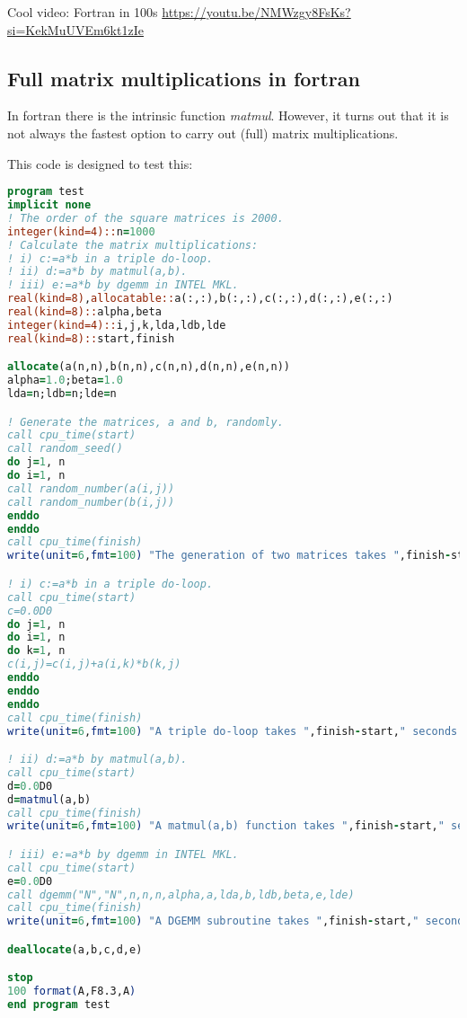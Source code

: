 
Cool video: Fortran in 100s \url{https://youtu.be/NMWzgy8FsKs?si=KekMuUVEm6kt1zIe}

\subsection{Full matrix multiplications in fortran}

In fortran there is the intrinsic function {\sl matmul}. However, it turns out that 
it is not always the fastest option to carry out (full) matrix multiplications.

This code is designed to test this:

\begin{lstlisting}[language=Fortran]
program test
implicit none
! The order of the square matrices is 2000.
integer(kind=4)::n=1000
! Calculate the matrix multiplications:
! i) c:=a*b in a triple do-loop.
! ii) d:=a*b by matmul(a,b).
! iii) e:=a*b by dgemm in INTEL MKL.
real(kind=8),allocatable::a(:,:),b(:,:),c(:,:),d(:,:),e(:,:)
real(kind=8)::alpha,beta
integer(kind=4)::i,j,k,lda,ldb,lde
real(kind=8)::start,finish

allocate(a(n,n),b(n,n),c(n,n),d(n,n),e(n,n))
alpha=1.0;beta=1.0
lda=n;ldb=n;lde=n

! Generate the matrices, a and b, randomly.
call cpu_time(start)
call random_seed()
do j=1, n
do i=1, n
call random_number(a(i,j))
call random_number(b(i,j))
enddo
enddo
call cpu_time(finish)
write(unit=6,fmt=100) "The generation of two matrices takes ",finish-start," seconds."

! i) c:=a*b in a triple do-loop.
call cpu_time(start)
c=0.0D0
do j=1, n
do i=1, n
do k=1, n
c(i,j)=c(i,j)+a(i,k)*b(k,j)
enddo
enddo
enddo
call cpu_time(finish)
write(unit=6,fmt=100) "A triple do-loop takes ",finish-start," seconds."

! ii) d:=a*b by matmul(a,b).
call cpu_time(start)
d=0.0D0
d=matmul(a,b)
call cpu_time(finish)
write(unit=6,fmt=100) "A matmul(a,b) function takes ",finish-start," seconds."

! iii) e:=a*b by dgemm in INTEL MKL.
call cpu_time(start)
e=0.0D0
call dgemm("N","N",n,n,n,alpha,a,lda,b,ldb,beta,e,lde)
call cpu_time(finish)
write(unit=6,fmt=100) "A DGEMM subroutine takes ",finish-start," seconds."

deallocate(a,b,c,d,e)

stop
100 format(A,F8.3,A)
end program test
\end{lstlisting}

